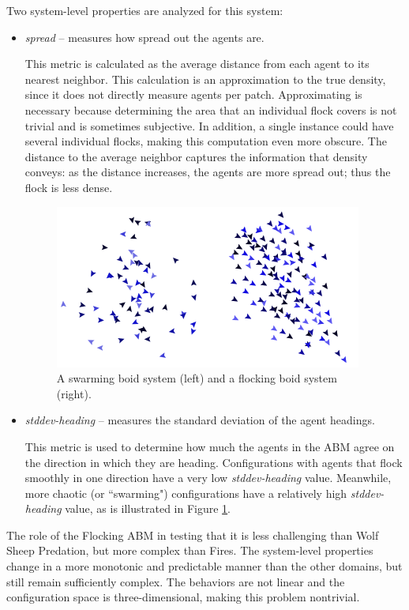 Two system-level properties are analyzed for this system:
\begin{itemize}
\item \textit{spread} -- measures how spread out the agents are.

This metric is calculated as the average distance from each agent to its nearest neighbor.
This calculation is an approximation to the true density, since it does not directly measure agents per patch.
Approximating is necessary because determining the area that an individual flock covers is not trivial and is sometimes subjective.
In addition, a single instance could have several individual flocks, making this computation even more obscure.
The distance to the average neighbor captures the information that density conveys: as the distance increases, the agents are more spread out; thus the flock is less dense.

\begin{figure}[ht]
\centering
\includegraphics[scale=1]{images/swarmVSflock.png}
\caption{A swarming boid system (left) and a flocking boid system (right).}
\label{fig:swarmVSflock}
\end{figure}

\item \textit{stddev-heading} -- measures the standard deviation of the agent headings.

This metric is used to determine how much the agents in the ABM agree on the direction in which they are heading.
Configurations with agents that flock smoothly in one direction have a very low \textit{stddev-heading} value.
Meanwhile, more chaotic (or ``swarming") configurations have a relatively high \textit{stddev-heading} value, as is illustrated in Figure \ref{fig:swarmVSflock}.

\end{itemize}

The role of the Flocking ABM in testing \fw that it is less challenging than Wolf Sheep Predation, but more complex than Fires.
The system-level properties change in a more monotonic and predictable manner than the other domains, but still remain sufficiently complex.
The behaviors are not linear and the configuration space is three-dimensional, making this problem nontrivial. 

